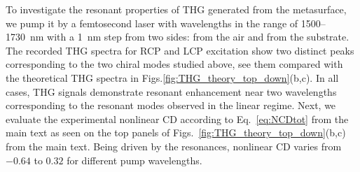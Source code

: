 \documentclass[
    reprint,
    superscriptaddress,
    a4paper,
    amsmath,amssymb,
    prb,
]{revtex4-2}
\begin{document}
To investigate the resonant properties of THG generated from the metasurface, we pump it by a femtosecond laser with wavelengths in the range of 1500--1730~nm with a 1~nm step from two sides: from the air and from the substrate. The recorded THG spectra for RCP and LCP excitation show two distinct peaks corresponding to the two chiral modes studied above, see them compared with the theoretical THG spectra in Figs.\ref{fig:THG_theory_top_down}(b,c). In all cases, THG signals demonstrate resonant enhancement near two wavelengths corresponding to the resonant modes observed in the linear regime. 
Next, we evaluate the experimental nonlinear CD according to Eq.~\eqref{eq:NCDtot} from the main text as seen on the top panels of Figs.~\ref{fig:THG_theory_top_down}(b,c) from the main text. Being driven by the resonances, nonlinear CD varies from $-0.64$ to $0.32$ for different pump wavelengths. 
\end{document}
